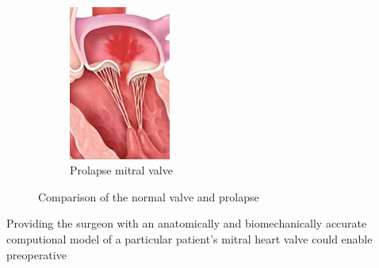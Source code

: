 \begin{figure}[H]
\begin{subfigure}[b]{0.3\textwidth}
      \label{fig:gull}
  \end{subfigure}
  ~ %
  \begin{subfigure}[b]{0.3\textwidth}
    \includegraphics[width=\textwidth]{./fig/prolapseMT.png}
      \caption{Prolapse mitral valve}
      \label{fig:tiger}
  \end{subfigure}
  \caption{Comparison of the normal valve and prolapse}\label{fig:rodSystem}      
\end{figure} 
Providing the surgeon with an anatomically and biomechanically accurate computional
model of a particular patient's mitral heart valve could enable preoperative
